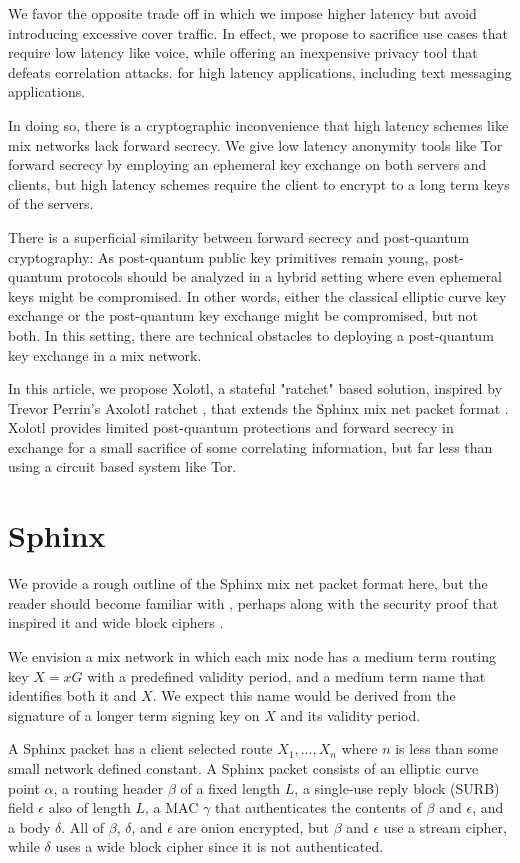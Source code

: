 \documentclass[twoside,letterpaper]{llncs}
\begin{document}
We favor the opposite trade off in which we impose higher latency but
avoid introducing excessive cover traffic. In effect, we propose to
sacrifice use cases that require low latency like voice, while
offering an inexpensive privacy tool that defeats correlation attacks.
for high latency applications, including text messaging applications.

In doing so, there is a cryptographic inconvenience that high latency
schemes like mix networks lack forward secrecy.  We give low latency
anonymity tools like Tor forward secrecy by employing an ephemeral
key exchange on both servers and clients, but high latency schemes
require the client to encrypt to a long term keys of the servers.

There is a superficial similarity between forward secrecy and
post-quantum cryptography:  As post-quantum public key primitives
remain young, post-quantum protocols should be analyzed in a hybrid
setting where even ephemeral keys might be compromised.  
In other words, either the classical elliptic curve key exchange or
the post-quantum key exchange might be compromised, but not both. 
In this setting, there are technical obstacles to deploying a
post-quantum key exchange in a mix network.  

In this article, we propose Xolotl, a stateful "ratchet" based
solution, inspired by Trevor Perrin's Axolotl ratchet \cite{TextSecure},
that extends the Sphinx mix net packet format \cite{Sphinx}.
Xolotl provides limited post-quantum protections and forward secrecy
in exchange for a small sacrifice of some correlating information,
but far less than using a circuit based system like Tor.


\section{Sphinx}

We provide a rough outline of the Sphinx mix net packet format here,
but the reader should become familiar with \cite{Sphinx}, perhaps 
along with the security proof that inspired it \cite{FormalOnion}
 and wide block ciphers \cite{Lionness}.

We envision a mix network in which each mix node has a
medium term routing key $X = x G$ with a predefined validity period,
and a medium term name that identifies both it and $X$.
We expect this name would be derived from the signature of a longer
term signing key on $X$ and its validity period.

A Sphinx packet has a client selected route $X_1,\ldots,X_n$
where $n$ is less than some small network defined constant.
A Sphinx packet consists of an elliptic curve point $\alpha$,
a routing header $\beta$ of a fixed length $L$,
a single-use reply block (SURB) field $\epsilon$ also of length $L$,
a MAC $\gamma$ that authenticates the contents of $\beta$ and $\epsilon$,
and a body $\delta$.
All of $\beta$, $\delta$, and $\epsilon$ are onion encrypted,
but $\beta$ and $\epsilon$ use a stream cipher, while
 $\delta$ uses a wide block cipher since it is not authenticated.
\end{document}
